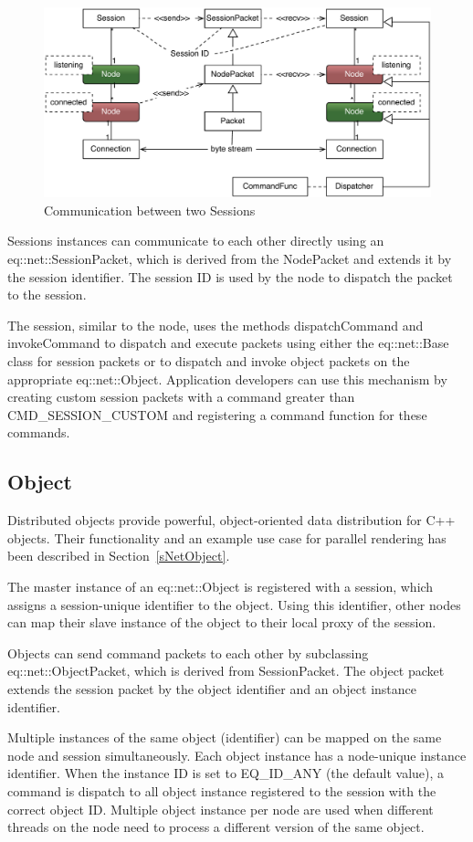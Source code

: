 \documentclass[10pt,a4]{scrartcl}
\newcommand{\sref}[1]{Section~\ref{#1}}
\begin{document}
\begin{figure}
  \includegraphics[width=.618\textwidth]{images/netSession.pdf}
  {\caption{\label{fNetSession}Communication between two Sessions}}
\end{figure}
Sessions instances can communicate to each other directly using an
\textsf{eq::net::Ses\-sion\-Packet}, which is derived from the
\textsf{NodePacket} and extends it by the session identifier. The
session ID is used by the node to dispatch the packet to the session.

The session, similar to the node, uses the methods
\textsf{dispatchCommand} and \textsf{invokeCommand} to dispatch and
execute packets using either the \textsf{eq::net::Base} class for
session packets or to dispatch and invoke object packets on the
appropriate \textsf{eq::net::Object}. Application developers can use
this mechanism by creating custom session packets with a command greater
than \textsf{CMD\_SESSION\_CUSTOM} and registering a command function
for these commands.


\subsection{\label{sNetObject2}Object}

Distributed objects provide powerful, object-oriented data
distribution for C++ objects. Their functionality and an example use
case for parallel rendering has been described in \sref{sNetObject}.

The master instance of an \textsf{eq::net::Object} is registered with a
session, which assigns a session-unique identifier to the object. Using
this identifier, other nodes can map their slave instance of the object
to their local proxy of the session.

Objects can send command packets to each other by subclassing
\textsf{eq::net::Ob\-ject\-Packet}, which is derived from
\textsf{SessionPacket}. The object packet extends the session packet by
the object identifier and an object instance identifier.

Multiple instances of the same object (identifier) can be mapped on the
same node and session simultaneously. Each object instance has a
node-unique instance identifier. When the instance ID is set to
\textsf{EQ\_ID\_ANY} (the default value), a command is dispatch to all
object instance registered to the session with the correct object
ID. Multiple object instance per node are used when different threads on
the node need to process a different version of the same object.
\end{document}
